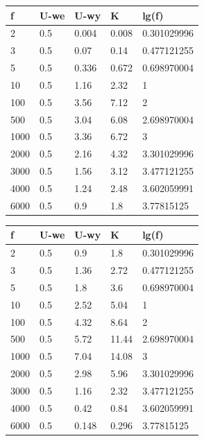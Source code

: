 \documentclass[11pt]{article}
\begin{document}
\begin{figure}[!ht]
\vspace{1em}

\begin{minipage}[t]{0.48\textwidth}
\centering
{}
\begin{tabular}{|l|l|l|l|l|}
\hline
    f & U-we & U-wy & K & lg(f) \\ \hline
    2 & 0.5 & 0.004 & 0.008 & 0.301029996 \\ \hline
    3 & 0.5 & 0.07 & 0.14 & 0.477121255 \\ \hline
    5 & 0.5 & 0.336 & 0.672 & 0.698970004 \\ \hline
    10 & 0.5 & 1.16 & 2.32 & 1 \\ \hline
    100 & 0.5 & 3.56 & 7.12 & 2 \\ \hline
    500 & 0.5 & 3.04 & 6.08 & 2.698970004 \\ \hline
    1000 & 0.5 & 3.36 & 6.72 & 3 \\ \hline
    2000 & 0.5 & 2.16 & 4.32 & 3.301029996 \\ \hline
    3000 & 0.5 & 1.56 & 3.12 & 3.477121255 \\ \hline
    4000 & 0.5 & 1.24 & 2.48 & 3.602059991 \\ \hline
    6000 & 0.5 & 0.9 & 1.8 & 3.77815125 \\ \hline
\end{tabular}
\end{minipage}
\hfill
\begin{minipage}[t]{0.48\textwidth}
\centering
{}
\begin{tabular}{|l|l|l|l|l|}
\hline
    f & U-we & U-wy & K & lg(f) \\ \hline
    2 & 0.5 & 0.9 & 1.8 & 0.301029996 \\ \hline
    3 & 0.5 & 1.36 & 2.72 & 0.477121255 \\ \hline
    5 & 0.5 & 1.8 & 3.6 & 0.698970004 \\ \hline
    10 & 0.5 & 2.52 & 5.04 & 1 \\ \hline
    100 & 0.5 & 4.32 & 8.64 & 2 \\ \hline
    500 & 0.5 & 5.72 & 11.44 & 2.698970004 \\ \hline
    1000 & 0.5 & 7.04 & 14.08 & 3 \\ \hline
    2000 & 0.5 & 2.98 & 5.96 & 3.301029996 \\ \hline
    3000 & 0.5 & 1.16 & 2.32 & 3.477121255 \\ \hline
    4000 & 0.5 & 0.42 & 0.84 & 3.602059991 \\ \hline
    6000 & 0.5 & 0.148 & 0.296 & 3.77815125 \\ \hline
\end{tabular}
\end{minipage}

\end{figure}
\FloatBarrier %
\end{document}
